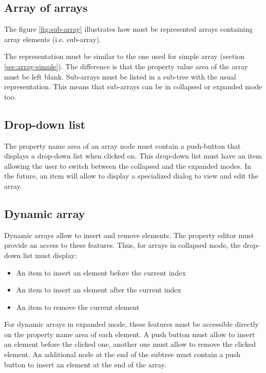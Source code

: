 \documentclass[a4paper, twoside]{report}
\begin{document}

\subsection{Array of arrays\label{sec:array-subarray}}

The figure \ref{fig:sub-array} illustrates how must be represented arrays containing array elements
(i.e. sub-array).

The representation must be similar to the one used for simple array (section
\ref{sec:array-simple}). The difference is that the property value area of the array must be left
blank. Sub-arrays must be listed in a sub-tree with the usual representation. This means that
sub-arrays can be in collapsed or expanded mode too.


\subsection{Drop-down list\label{sec:array-dropdownlist}}

The property name area of an array node must contain a push-button that displays a drop-down list
when clicked on. This drop-down list must have an item allowing the user to switch between the collapsed and
the expanded modes. In the future, an item will allow to display a specialized dialog to view and
edit the array.

\subsection{Dynamic array\label{sec:array-dynamic}}

Dynamic arrays allow to insert and remove elements. The property editor must provide an access to
these features. Thus, for arrays in collapsed mode, the drop-down list must display:
\begin{itemize}
    \item An item to insert an element before the current index
    \item An item to insert an element after the current index
    \item An item to remove the current element
\end{itemize}

For dynamic arrays in expanded mode, these features must be accessible directly on the property name
area of each element. A push button must allow to insert an element before the clicked one, another
one must allow to remove the clicked element. An additional node at the end of the subtree must contain a push button to insert an element at the end of the array.
\end{document}
